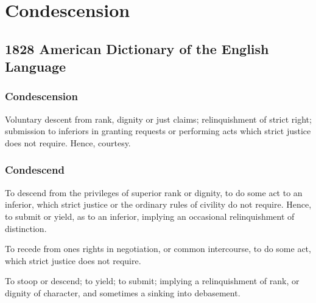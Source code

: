 \section{Condescension}
	\label{CONDESCENSION}
	

\subsection{1828 American Dictionary of the English Language} %
	\label{CONDESCENSION-1828}

	\subsubsection{Condescension}

		\begin{compactitem}
			\item Voluntary descent from rank, dignity or just claims; relinquishment of strict right; submission to inferiors in granting requests or performing acts which strict justice does not require. Hence, courtesy.
		\end{compactitem}
		
	\subsubsection{Condescend}
	
		\begin{compactitem}
			\item[1] To descend from the privileges of superior rank or dignity, to do some act to an inferior, which strict justice or the ordinary rules of civility do not require. Hence, to submit or yield, as to an inferior, implying an occasional relinquishment of distinction.
			\item[2] To recede from ones rights in negotiation, or common intercourse, to do some act, which strict justice does not require.
			\item[3] To stoop or descend; to yield; to submit; implying a relinquishment of rank, or dignity of character, and sometimes a sinking into debasement.
		\end{compactitem}

